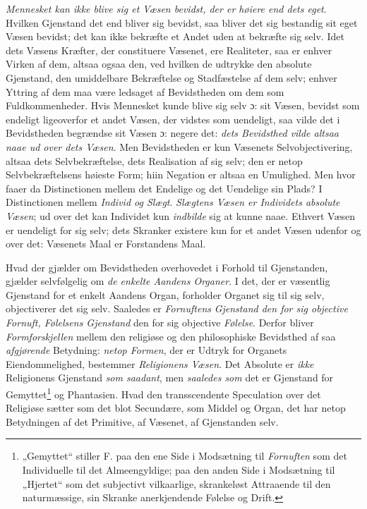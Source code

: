 \emph{Mennesket kan ikke blive sig et Væsen bevidst, der er høiere end dets
eget}. Hvilken Gjenstand det end bliver sig bevidst, saa bliver det sig
bestandig sit eget Væsen bevidst; det kan ikke bekræfte et Andet uden at
bekræfte sig selv. Idet dets Væsens Kræfter, der constituere Væsenet, ere
Realiteter, saa er enhver Virken af dem, altsaa ogsaa den, ved hvilken de
udtrykke den absolute Gjenstand, den umiddelbare Bekræftelse og Stadfæstelse af
dem selv; enhver Yttring af dem maa være ledsaget af Bevidstheden om dem som
Fuldkommenheder. Hvis Mennesket kunde blive sig selv ɔ: sit Væsen, bevidst som
endeligt ligeoverfor et andet Væsen, der vidstes som uendeligt, saa vilde det i
Bevidstheden begrændse sit Væsen ɔ: negere det: \emph{dets Bevidsthed vilde
altsaa naae ud over dets Væsen}. Men Bevidstheden er kun Væsenets
Selvobjectivering, altsaa dets Selvbekræftelse, dets Realisation af sig selv;
den er netop Selvbekræftelsens høieste Form; hiin Negation er altsaa en
Umulighed. Men hvor faaer da Distinctionen mellem det Endelige og det Uendelige
sin Plads? I Distinctionen mellem \emph{Individ og Slægt}. \emph{Slægtens Væsen
er Individets absolute Væsen}; ud over det kan Individet kun \emph{indbilde}
sig at kunne naae. Ethvert Væsen er uendeligt for sig selv; dets Skranker
existere kun for et andet Væsen udenfor og over det: Væsenets Maal er
Forstandens Maal.

Hvad der gjælder om Bevidstheden overhovedet i Forhold til Gjenstanden, gjælder
selvfølgelig om \emph{de enkelte Aandens Organer}. I det, der er væsentlig
Gjenstand for et enkelt Aandens Organ, forholder Organet sig til sig selv,
objectiverer det sig selv. Saaledes er \emph{Fornuftens}
 \setcounter{footnote}{0}%
\emph{Gjenstand den for sig objective Fornuft, Følelsens Gjenstand} den for sig
objective \emph{Følelse}. Derfor bliver \emph{Formforskjellen} mellem den
religiøse og den philosophiske Bevidsthed af saa \emph{afgjørende} Betydning:
\emph{netop Formen}, der er Udtryk for Organets Eiendommelighed, bestemmer
\emph{Religionens Væsen}. Det Absolute er \emph{ikke} Religionens Gjenstand
\emph{som saadant}, men \emph{saaledes som} det er Gjenstand for
Gemyttet\footnote{„Gemyttet“ stiller F. paa den ene Side i Modsætning til
\emph{Fornuften} som det Individuelle til det Almeengyldige; paa den anden Side
i Modsætning til „Hjertet“ som det subjectivt vilkaarlige, skrankeløst
Attraaende til den naturmæssige, sin Skranke anerkjendende Følelse og Drift.}
og Phantasien. Hvad den transscendente Speculation over det Religiøse sætter
som det blot Secundære, som Middel og Organ, det har netop Betydningen af det
Primitive, af Væsenet, af Gjenstanden selv.


